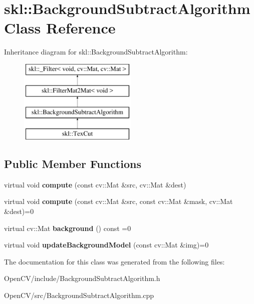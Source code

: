 \hypertarget{classskl_1_1_background_subtract_algorithm}{}\section{skl\+:\+:Background\+Subtract\+Algorithm Class Reference}
\label{classskl_1_1_background_subtract_algorithm}
Inheritance diagram for skl\+:\+:Background\+Subtract\+Algorithm\+:\begin{figure}[H]
\begin{center}
\leavevmode
\includegraphics[height=4.000000cm]{classskl_1_1_background_subtract_algorithm}
\end{center}
\end{figure}
\subsection*{Public Member Functions}
\begin{DoxyCompactItemize}
\item 
\hypertarget{classskl_1_1_background_subtract_algorithm_a7668b90a228834226c6a8b4455b7d90d}{}\label{classskl_1_1_background_subtract_algorithm_a7668b90a228834226c6a8b4455b7d90d} 
virtual void {\bfseries compute} (const cv\+::\+Mat \&src, cv\+::\+Mat \&dest)
\item 
\hypertarget{classskl_1_1_background_subtract_algorithm_abb85a3bca26d5d3c068c64ac23be357e}{}\label{classskl_1_1_background_subtract_algorithm_abb85a3bca26d5d3c068c64ac23be357e} 
virtual void {\bfseries compute} (const cv\+::\+Mat \&src, const cv\+::\+Mat \&mask, cv\+::\+Mat \&dest)=0
\item 
\hypertarget{classskl_1_1_background_subtract_algorithm_a47674198d79e2394d072ffa5a2a74d0a}{}\label{classskl_1_1_background_subtract_algorithm_a47674198d79e2394d072ffa5a2a74d0a} 
virtual cv\+::\+Mat {\bfseries background} () const =0
\item 
\hypertarget{classskl_1_1_background_subtract_algorithm_aefe8422738decfcfb16ea8d7ea69c7c1}{}\label{classskl_1_1_background_subtract_algorithm_aefe8422738decfcfb16ea8d7ea69c7c1} 
virtual void {\bfseries update\+Background\+Model} (const cv\+::\+Mat \&img)=0
\end{DoxyCompactItemize}


The documentation for this class was generated from the following files\+:\begin{DoxyCompactItemize}
\item 
Open\+C\+V/include/Background\+Subtract\+Algorithm.\+h\item 
Open\+C\+V/src/Background\+Subtract\+Algorithm.\+cpp\end{DoxyCompactItemize}
